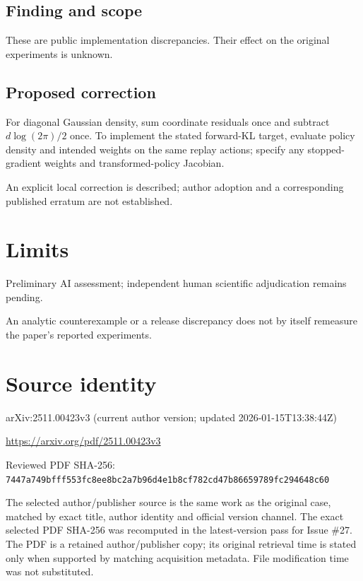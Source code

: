 \documentclass[11pt]{article}
\begin{document}
\subsection*{Finding and scope}

These are public implementation discrepancies. Their effect on the original experiments is unknown.

\subsection*{Proposed correction}

For diagonal Gaussian density, sum coordinate residuals once and subtract \(d\log(2\pi)/2\) once. To implement the stated forward-KL target, evaluate policy density and intended weights on the same replay actions; specify any stopped-gradient weights and transformed-policy Jacobian.

An explicit local correction is described; author adoption and a corresponding published erratum are not established.

\section*{Limits}

Preliminary AI assessment; independent human scientific adjudication remains pending.\par

An analytic counterexample or a release discrepancy does not by itself remeasure the paper’s reported experiments.\par

\section*{Source identity}

arXiv:2511.00423v3 (current author version; updated 2026-01-15T13:38:44Z)

\url{https://arxiv.org/pdf/2511.00423v3}

Reviewed PDF SHA-256: \nolinkurl{7447a749bfff553fc8ee8bc2a7b96d4e1b8cf782cd47b86659789fc294648c60}

The selected author/publisher source is the same work as the original case, matched by exact title, author identity and official version channel. The exact selected PDF SHA-256 was recomputed in the latest-version pass for Issue \#27. The PDF is a retained author/publisher copy; its original retrieval time is stated only when supported by matching acquisition metadata. File modification time was not substituted.
\end{document}
